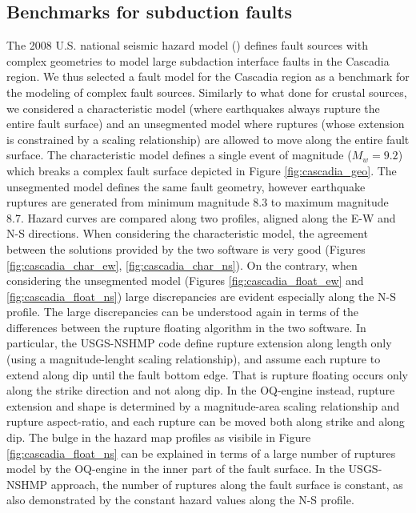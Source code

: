 \subsection{Benchmarks for subduction faults}
The 2008 U.S. national seismic hazard model (\cite{pertersen2008}) defines fault sources with complex geometries to model large subdaction interface faults in the Cascadia region. We thus selected a fault model for the Cascadia region as a benchmark for the modeling of complex fault sources. Similarly to what done for crustal sources, we considered a characteristic model (where earthquakes always rupture the entire fault surface) and an unsegmented model where ruptures (whose extension is constrained by a scaling relationship) are allowed to move along the entire fault surface. The characteristic model defines a single event of magnitude ($M_{w}=9.2$) which breaks a complex fault surface depicted in Figure \ref{fig:cascadia_geo}. The unsegmented model defines the same fault geometry, however earthquake ruptures are generated from minimum magnitude 8.3 to maximum magnitude 8.7. Hazard curves are compared along two profiles, aligned along the E-W and N-S directions. When considering the characteristic model, the agreement between the solutions provided by the two software is very good (Figures \ref{fig:cascadia_char_ew}, \ref{fig:cascadia_char_ns}). On the contrary, when considering the unsegmented model (Figures \ref{fig:cascadia_float_ew} and \ref{fig:cascadia_float_ns}) large discrepancies are evident especially along the N-S profile. The large discrepancies can be understood again in terms of the differences between the rupture floating algorithm in the two software. In particular, the USGS-NSHMP code define rupture extension along length only (using a magnitude-lenght scaling relationship), and assume each rupture to extend along dip until the fault bottom edge. That is rupture floating occurs only along the strike direction and not along dip. In the OQ-engine instead, rupture extension and shape is determined by a magnitude-area scaling relationship and rupture aspect-ratio, and each rupture can be moved both along strike and along dip. The bulge in the hazard map profiles as visibile in Figure \ref{fig:cascadia_float_ns} can be explained in terms of a large number of ruptures model by the OQ-engine in the inner part of the fault surface. In the USGS-NSHMP approach, the number of ruptures along the fault surface is constant, as also demonstrated by the constant hazard values along the N-S profile.
